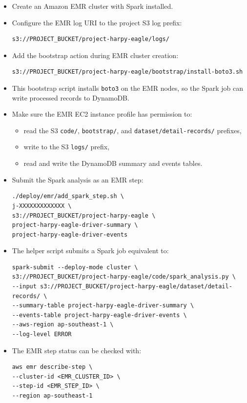 \documentclass[12pt,a4paper]{article}
\begin{document}
\begin{itemize}
    \item Create an Amazon EMR cluster with Spark installed.
    \item Configure the EMR log URI to the project S3 log prefix:
\begin{lstlisting}
s3://PROJECT_BUCKET/project-harpy-eagle/logs/
\end{lstlisting}

    \item Add the bootstrap action during EMR cluster creation:
\begin{lstlisting}
s3://PROJECT_BUCKET/project-harpy-eagle/bootstrap/install-boto3.sh
\end{lstlisting}

    \item This bootstrap script installs \texttt{boto3} on the EMR nodes, so the Spark job can write processed records to DynamoDB.
    \item Make sure the EMR EC2 instance profile has permission to:
    \begin{itemize}
        \item read the S3 \texttt{code/}, \texttt{bootstrap/}, and \texttt{dataset/detail-records/} prefixes,
        \item write to the S3 \texttt{logs/} prefix,
        \item read and write the DynamoDB summary and events tables.
    \end{itemize}

    \item Submit the Spark analysis as an EMR step:
\begin{lstlisting}
./deploy/emr/add_spark_step.sh \
j-XXXXXXXXXXXXX \
s3://PROJECT_BUCKET/project-harpy-eagle \
project-harpy-eagle-driver-summary \
project-harpy-eagle-driver-events
\end{lstlisting}

    \item The helper script submits a Spark job equivalent to:
\begin{lstlisting}
spark-submit --deploy-mode cluster \
s3://PROJECT_BUCKET/project-harpy-eagle/code/spark_analysis.py \
--input s3://PROJECT_BUCKET/project-harpy-eagle/dataset/detail-records/ \
--summary-table project-harpy-eagle-driver-summary \
--events-table project-harpy-eagle-driver-events \
--aws-region ap-southeast-1 \
--log-level ERROR
\end{lstlisting}

    \item The EMR step status can be checked with:
\begin{lstlisting}
aws emr describe-step \
--cluster-id <EMR_CLUSTER_ID> \
--step-id <EMR_STEP_ID> \
--region ap-southeast-1
\end{lstlisting}


\end{itemize}
\end{document}
